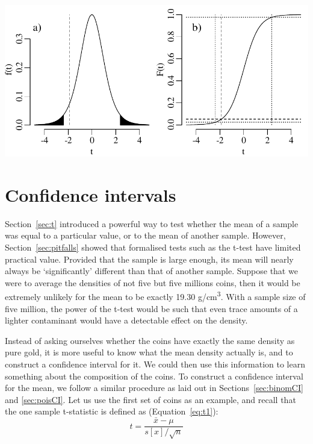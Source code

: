 \noindent\begin{minipage}[t][][b]{.6\textwidth}
  \includegraphics[]{../figures/2samplettest.pdf}\medskip
\end{minipage}
\begin{minipage}[t][][t]{.4\textwidth}
  \label{fig:2samplettest}
\end{minipage}

\section{Confidence intervals}
\label{eq:tconf}

Section~\ref{sec:t} introduced a powerful way to test whether the mean
of a sample was equal to a particular value, or to the mean of another
sample. However, Section~\ref{sec:pitfalls} showed that formalised
tests such as the t-test have limited practical value. Provided that
the sample is large enough, its mean will nearly always be
`significantly' different than that of another sample. Suppose that we
were to average the densities of not five but five millions coins,
then it would be extremely unlikely for the mean to be exactly 19.30
g/cm\textsuperscript{3}. With a sample size of five million, the power
of the t-test would be such that even trace amounts of a lighter
contaminant would have a detectable effect on the density.\medskip

Instead of asking ourselves whether the coins have exactly the same
density as pure gold, it is more useful to know what the mean density
actually is, and to construct a confidence interval for it. We could
then use this information to learn something about the composition of
the coins. To construct a confidence interval for the mean, we follow
a similar procedure as laid out in Sections~\ref{sec:binomCI} and
\ref{sec:poisCI}. Let us use the first set of coins as an example, and
recall that the one sample t-statistic is defined as
(Equation~\ref{eq:t1}):
\[
  t = \frac{\bar{x} - \mu}{s[x]/\sqrt{n}}
\]

